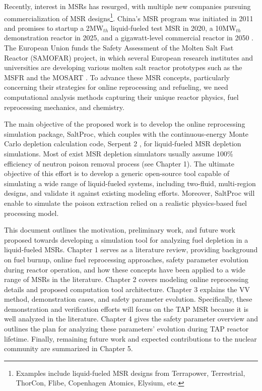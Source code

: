 Recently, interest in \glspl{MSR} has resurged, with multiple new companies 
pursuing commercialization of \gls{MSR} designs\footnote{Examples 
include liquid-fueled \gls{MSR} designs from Terrapower, Terrestrial, 
ThorCon, Flibe, Copenhagen Atomics, Elysium, etc.}. China's \gls{MSR} program 
was initiated in 2011 and promises to startup a 2MW$_{th}$ 
liquid-fueled test \gls{MSR} in 2020, a 10MW$_{th}$ 
demonstration reactor in 2025, and a gigawatt-level 
commercial reactor in 2050 \cite{zhang_review_2018}. The European 
Union funds the Safety Assessment of the Molten Salt Fast Reactor 
(SAMOFAR) project, in which several European research institutes and 
universities are developing various molten salt reactor prototypes 
such as the \gls{MSFR} \cite{fiorina_molten_2013} and the \gls{MOSART} 
\cite{ignatiev_molten_2014}. To advance these \gls{MSR} concepts, particularly 
concerning their strategies for online reprocessing and refueling, 
we need computational analysis methods capturing their unique reactor physics, 
fuel reprocessing mechanics, and chemistry. 

The main objective of the proposed work is to develop the online 
reprocessing simulation package, SaltProc, which couples with the 
continuous-energy Monte Carlo depletion calculation code, Serpent 2 
\cite{leppanen_serpent_2014}, for liquid-fueled \gls{MSR} depletion 
simulations. Most of exist \gls{MSR} depletion simulators usually assume 100\% 
efficiency of neutron poison removal process (see Chapter 1). The ultimate 
objective of this effort is to develop a generic open-source tool capable of 
simulating a wide range of liquid-fueled systems, including two-fluid, 
multi-region designs, and validate it against existing modeling efforts. 
Moreover, SaltProc will enable to simulate the poison extraction relied on a 
realistic physics-based fuel processing model.

This document outlines the motivation, preliminary work, and future work 
proposed towards developing a simulation tool for analyzing fuel depletion in 
a liquid-fueled \glspl{MSR}. Chapter 1 serves as a literature review, 
providing background on fuel burnup, online fuel reprocessing approaches, 
safety parameter evolution during reactor operation, and how these 
concepts have been applied to a wide range of \glspl{MSR} in the literature. 
Chapter 2 covers modeling online reprocessing details and proposed computation 
tool architecture. Chapter 3 explains the \gls{VV} method, demonstration 
cases, and safety parameter evolution. Specifically, these demonstration and 
verification efforts will focus on the \gls{TAP} \gls{MSR} because it is well 
analyzed in the literature. Chapter 4 gives the safety parameter overview and 
outlines the plan for analyzing these parameters' evolution during \gls{TAP} 
reactor lifetime. Finally, remaining future work and expected contributions to 
the nuclear community are summarized in Chapter 5.

